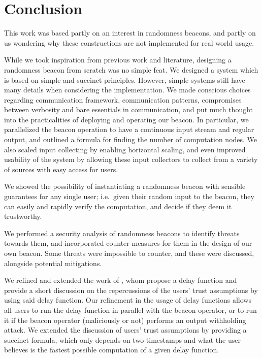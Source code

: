 \section{Conclusion}%
\label{sec:conclusion}

This work was based partly on an interest in randomness beacons, and partly on us wondering why these constructions are not implemented for real world usage.

While we took inspiration from previous work and literature, designing a randomness beacon from scratch was no simple feat.
We designed a system which is based on simple and succinct principles.
However, simple systems still have many details when considering the implementation.
We made conscious choices regarding communication framework, communication patterns, compromises between verbosity and bare essentials in communication, and put much thought into the practicalities of deploying and operating our beacon.
In particular, we parallelized the beacon operation to have a continuous input stream and regular output, and outlined a formula for finding the number of computation nodes.
We also scaled input collecting by enabling horizontal scaling, and even improved usability of the system by allowing these input collectors to collect from a variety of sources with easy access for users.

We showed the possibility of instantiating a randomness beacon with sensible guarantees for any single user; i.e.\ given their random input to the beacon, they can easily and rapidly verify the computation, and decide if they deem it trustworthy.

We performed a security analysis of randomness beacons to identify threats towards them, and incorporated counter measures for them in the design of our own beacon.
Some threats were impossible to counter, and these were discussed, alongside potential mitigations.

We refined and extended the work of \citet{randomzoo}, whom propose a delay function and provide a short discussion on the repercussions of the users' trust assumptions by using said delay function.
Our refinement in the usage of delay functions allows all users to run the delay function in parallel with the beacon operator, or to run it if the beacon operator (maliciously or not) performs an output withholding attack.
We extended the discussion of users' trust assumptions by providing a succinct formula, which only depends on two timestamps and what the user believes is the fastest possible computation of a given delay function.

